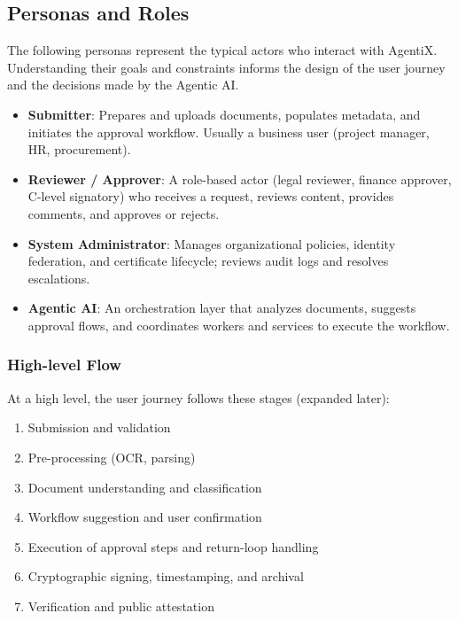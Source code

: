 \documentclass[12pt,oneside,openright,a4paper]{cpe-english-project}
\begin{document}
\subsection{Personas and Roles}

The following personas represent the typical actors who interact with
AgentiX. Understanding their goals and constraints informs the design
of the user journey and the decisions made by the Agentic AI.

\begin{itemize}
  \item \textbf{Submitter}: Prepares and uploads documents, populates
    metadata, and initiates the approval workflow. Usually a business
    user (project manager, HR, procurement).
  \item \textbf{Reviewer / Approver}: A role-based actor (legal reviewer,
    finance approver, C-level signatory) who receives a request, reviews
    content, provides comments, and approves or rejects.
  \item \textbf{System Administrator}: Manages organizational policies,
    identity federation, and certificate lifecycle; reviews audit logs
    and resolves escalations.
  \item \textbf{Agentic AI}: An orchestration layer that analyzes
    documents, suggests approval flows, and coordinates workers and
    services to execute the workflow.
\end{itemize}

\subsubsection{High-level Flow}

At a high level, the user journey follows these stages (expanded later):

\begin{enumerate}
  \item Submission and validation
  \item Pre-processing (OCR, parsing)
  \item Document understanding and classification
  \item Workflow suggestion and user confirmation
  \item Execution of approval steps and return-loop handling
  \item Cryptographic signing, timestamping, and archival
  \item Verification and public attestation
\end{enumerate}
\end{document}
